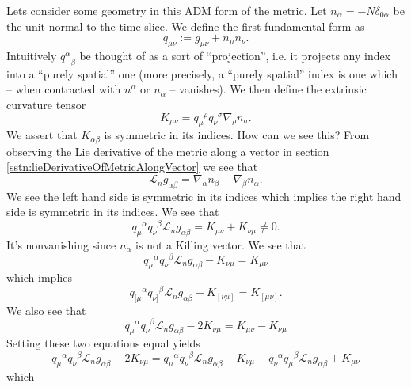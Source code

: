 Lets consider some geometry in this ADM form of the metric. Let
$n_{\alpha}=-N\delta_{0\alpha}$ be the unit normal to the time
slice. We define the first fundamental form as
\begin{equation}%
q_{\mu\nu}:=g_{\mu\nu}+n_{\mu}n_{\nu}.
\end{equation}
Intuitively ${q^{\alpha}}_{\beta}$ be thought of as a sort of ``projection'',
i.e. it projects any index into a ``purely spatial'' one (more
precisely, a ``purely spatial'' index is one which -- when
contracted with $n^\alpha$ or $n_\alpha$ -- vanishes). We then
define the  extrinsic curvature tensor
\begin{equation}%
K_{\mu\nu} = {q_{\mu}}^{\rho}{q_{\nu}}^{\sigma}\nabla_{\rho}n_{\sigma}.
\end{equation}
We assert that $K_{\alpha\beta}$ is symmetric in its indices. How
can we see this? From observing the Lie derivative of the metric
along a vector in section \ref{sstn:lieDerivativeOfMetricAlongVector}
 we see that
\begin{equation}%
\mathscr{L}_{n}g_{\alpha\beta} = \nabla_{\alpha}n_{\beta}+\nabla_{\beta}n_{\alpha}.
\end{equation}
We see the left hand side is symmetric in its indices which
implies the right hand side is symmetric in its indices. We see
that
\begin{equation}%
{q_{\mu}}^{\alpha}{q_{\nu}}^{\beta}\mathscr{L}_{n}g_{\alpha\beta} = K_{\mu\nu}+K_{\nu\mu}\neq0.
\end{equation}
It's nonvanishing since $n_{\alpha}$ is not a Killing vector. We
see that
\begin{equation}%
{q_{\mu}}^{\alpha}{q_{\nu}}^{\beta}\mathscr{L}_{n}g_{\alpha\beta}
- K_{\nu\mu} = K_{\mu\nu}
\end{equation}
which implies
\begin{equation}%
{q_{[\mu}}^{\alpha}{q_{\nu]}}^{\beta}\mathscr{L}_{n}g_{\alpha\beta}
- K_{[\nu\mu]} = K_{[\mu\nu]}.
\end{equation}
We also see that
\begin{equation}%
{q_{\mu}}^{\alpha}{q_{\nu}}^{\beta}\mathscr{L}_{n}g_{\alpha\beta}
- 2K_{\nu\mu} = K_{\mu\nu}- K_{\nu\mu}
\end{equation}
Setting these two equations equal yields
\begin{equation}%
{q_{\mu}}^{\alpha}{q_{\nu}}^{\beta}\mathscr{L}_{n}g_{\alpha\beta}
- 2K_{\nu\mu} = {q_{\mu}}^{\alpha}{q_{\nu}}^{\beta}\mathscr{L}_{n}g_{\alpha\beta}
- K_{\nu\mu} - {q_{\nu}}^{\alpha}{q_{\mu}}^{\beta}\mathscr{L}_{n}g_{\alpha\beta}
+ K_{\mu\nu}
\end{equation}
which
